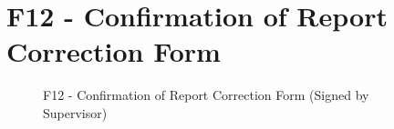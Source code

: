 \chapter{F12 - Confirmation of Report Correction Form}
\begin{figure}[h]
    \centering
    \setlength{\fboxsep}{0pt}
    \caption{F12 - Confirmation of Report Correction Form (Signed by Supervisor)}
    \label{fig:myfig86}
\end{figure}
\clearpage
